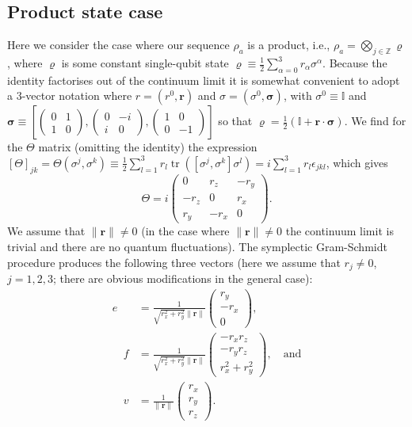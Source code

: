 \documentclass[prl,twocolumn,lengthcheck,superscriptaddress]{revtex4-1}
\newcommand{\tr}{\operatorname{tr}}
\theoremstyle{definition}
\theoremstyle{remark}
\begin{document}
\subsection{Product state case}
Here we consider the case where our sequence $\rho_a$ is a product, i.e., $\rho_a = \bigotimes_{j\in\mathbb{Z}} \varrho$, where $\varrho$ is some constant single-qubit state $\varrho \equiv \frac{1}{2}\sum_{\alpha=0}^3r_\alpha \sigma^\alpha$. Because the identity factorises out of the continuum limit it is somewhat convenient to adopt a $3$-vector notation where $r = (r^0, \mathbf{r})$ and  $\sigma = (\sigma^0, \boldsymbol{\sigma})$, with $\sigma^0 \equiv \mathbb{I}$ and $\boldsymbol{\sigma} \equiv \left[ \left(\begin{smallmatrix} 0 &1\\ 1& 0\end{smallmatrix}\right),  \left(\begin{smallmatrix} 0 &-i\\ i& 0\end{smallmatrix}\right),  \left(\begin{smallmatrix} 1 & 0\\ 0& -1\end{smallmatrix}\right) \right]$ so that $\varrho = \frac{1}{2}(\mathbb{I} + \mathbf{r}\cdot \boldsymbol{\sigma})$. We find for the $\Theta$ matrix (omitting the identity) the expression $[\Theta]_{jk} = \Theta(\sigma^j,\sigma^k) \equiv \frac12\sum_{l=1}^3 r_l \tr([\sigma^j,\sigma^k]\sigma^l) = i\sum_{l=1}^3 r_l \epsilon_{jkl}$, which gives
\begin{equation}
	\Theta = i\begin{pmatrix} 0 & r_z & -r_y \\  -r_z & 0 & r_x \\ r_y & -r_x & 0 \end{pmatrix}.
\end{equation}
We assume that $\|\mathbf{r}\| \not= 0$ (in the case where $\|\mathbf{r}\| \not= 0$ the continuum limit is trivial and there are no quantum fluctuations).
The symplectic Gram-Schmidt procedure produces the following three vectors (here we assume that $r_j \not= 0$, $j=1,2,3$; there are obvious modifications in the general case):
\begin{equation}
	\begin{split}
	e &= \frac{1}{\sqrt{r_x^2+r_y^2}\|\mathbf{r}\|}\begin{pmatrix} r_y \\ -r_x \\ 0\end{pmatrix}, \\  \quad f &= \frac{1}{\sqrt{r_x^2+r_y^2}\|\mathbf{r}\|}\begin{pmatrix} -r_xr_z\\ -r_yr_z \\ r_x^2+ r_y^2\end{pmatrix}, \quad \text{and} \\ \quad v &= \frac{1}{\|\mathbf{r}\|}\begin{pmatrix}r_x \\ r_y \\ r_z\end{pmatrix}.
	\end{split}
\end{equation}
\end{document}
